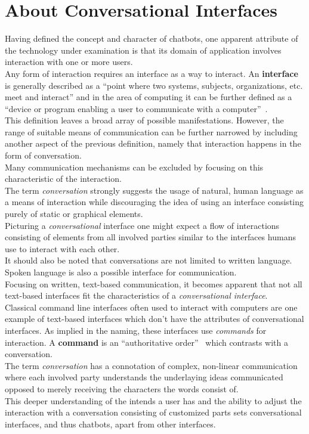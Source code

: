 \section{About Conversational Interfaces}


Having defined the concept and character of chatbots, one apparent attribute of the technology under examination is that its domain of application involves interaction with one or more users.
\\

Any form of interaction requires an interface as a way to interact.
An \textbf{interface} is generally described as a ``point where two systems, subjects, organizations, etc. meet and interact'' and in the area of computing it can be further defined as a ``device or program enabling a user to communicate with a computer''~\cite{oxfordinterface}.
\\

This definition leaves a broad array of possible manifestations.
However, the range of suitable means of communication can be further narrowed by including another aspect of the previous definition, namely that interaction happens in the form of conversation.
\\

Many communication mechanisms can be excluded by focusing on this characteristic of the interaction.
\\
The term \emph{conversation} strongly suggests the usage of natural, human language as a means of interaction
while discouraging the idea of using an interface consisting purely of static or graphical elements.
\\
Picturing a \emph{conversational} interface one might expect a flow of interactions consisting of elements from all involved parties similar to the interfaces humans use to interact with each other.
\\
It should also be noted that conversations are not limited to written language.
Spoken language is also a possible interface for communication.
\\

Focusing on written, text-based communication, it becomes apparent that not all text-based interfaces fit the characteristics of a \emph{conversational interface}.
\\
Classical command line interfaces often used to interact with computers are one example of text-based interfaces which don't have the attributes of conversational interfaces.
As implied in the naming, these interfaces use \emph{commands} for interaction. A \textbf{command} is an ``authoritative order''~\cite{oxfordcommand} which contrasts with a conversation.
\\
The term \emph{conversation} has a connotation of complex, non-linear communication where each involved party understands the underlaying ideas communicated opposed to merely receiving the characters the words consist of.
\\

This deeper understanding of the intends a user has and the ability to adjust the interaction with a conversation consisting of customized parts sets conversational interfaces, and thus chatbots, apart from other interfaces.
